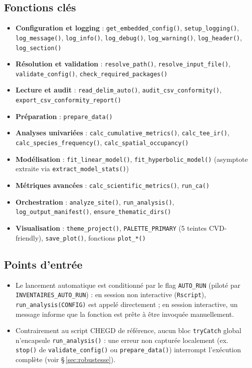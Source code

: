 \documentclass[11pt,a4paper]{article}
\begin{document}
\subsection{Fonctions clés}
\begin{itemize}
  \item \textbf{Configuration et logging} : \texttt{get\_embedded\_config()}, \texttt{setup\_logging()}, \texttt{log\_message()}, \texttt{log\_info()}, \texttt{log\_debug()}, \texttt{log\_warning()}, \texttt{log\_header()}, \texttt{log\_section()}
  \item \textbf{R\'esolution et validation} : \texttt{resolve\_path()}, \texttt{resolve\_input\_file()}, \texttt{validate\_config()}, \texttt{check\_required\_packages()}
  \item \textbf{Lecture et audit} : \texttt{read\_delim\_auto()}, \texttt{audit\_csv\_conformity()}, \texttt{export\_csv\_conformity\_report()}
  \item \textbf{Pr\'eparation} : \texttt{prepare\_data()}
  \item \textbf{Analyses univari\'ees} : \texttt{calc\_cumulative\_metrics()}, \texttt{calc\_tee\_ir()}, \texttt{calc\_species\_frequency()}, \texttt{calc\_spatial\_occupancy()}
  \item \textbf{Mod\'elisation} : \texttt{fit\_linear\_model()}, \texttt{fit\_hyperbolic\_model()} (asymptote extraite via \texttt{extract\_model\_stats()})
  \item \textbf{M\'etriques avanc\'ees} : \texttt{calc\_scientific\_metrics()}, \texttt{run\_ca()}
  \item \textbf{Orchestration} : \texttt{analyze\_site()}, \texttt{run\_analysis()}, \texttt{log\_output\_manifest()}, \texttt{ensure\_thematic\_dirs()}
  \item \textbf{Visualisation} : \texttt{theme\_project()}, \texttt{PALETTE\_PRIMARY} (5 teintes CVD-friendly), \texttt{save\_plot()}, fonctions \texttt{plot\_*()}
\end{itemize}

\subsection{Points d'entrée}
\begin{itemize}[leftmargin=1.2cm]
  \item Le lancement automatique est conditionné par le flag \texttt{AUTO\_RUN} (piloté par \texttt{INVENTAIRES\_AUTO\_RUN}) : en session non interactive (\texttt{Rscript}), \texttt{run\_analysis(CONFIG)} est appelé directement ; en session interactive, un message informe que la fonction est prête à être invoquée manuellement.
  \item Contrairement au script CHEGD de référence, aucun bloc \texttt{tryCatch} global n'encapsule \texttt{run\_analysis()} : une erreur non capturée localement (ex. \texttt{stop()} de \texttt{validate\_config()} ou \texttt{prepare\_data()}) interrompt l'exécution complète (voir \S\,\ref{sec:robustesse}).
\end{itemize}
\end{document}
